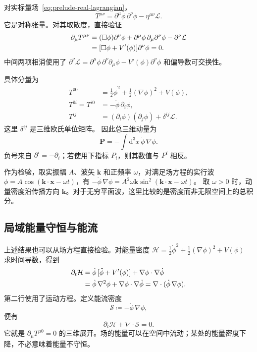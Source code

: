 对实标量场~\eqref{eq:prelude-real-lagrangian}，
\begin{equation}
  T^{\mu\nu}=\partial^{\mu}\phi\,\partial^{\nu}\phi
  -\eta^{\mu\nu}\mathcal{L}.
  \label{eq:prelude-scalar-tensor}
\end{equation}
它是对称张量。对其取散度，直接验证
\begin{align}
  \partial_{\mu}T^{\mu\nu}
  &=(\Box\phi)\partial^{\nu}\phi
    +\partial^{\mu}\phi\,\partial_{\mu}\partial^{\nu}\phi
    -\partial^{\nu}\mathcal{L}\notag\\
  &=[\Box\phi+V'(\phi)]\partial^{\nu}\phi=0.
\end{align}
中间两项相消使用了 $\partial^{\nu}\mathcal{L}
=\partial^{\mu}\phi\,\partial^{\nu}\partial_{\mu}\phi
-V'(\phi)\partial^{\nu}\phi$ 和偏导数可交换性。

具体分量为
\begin{align}
  T^{00}&=\frac12\dot\phi^{2}
    +\frac12(\nabla\phi)^{2}+V(\phi),\\
  T^{0i}=T^{i0}&=-\dot\phi\,\partial_{i}\phi,\\
  T^{ij}&=(\partial_{i}\phi)(\partial_{j}\phi)
    +\delta^{ij}\mathcal{L}.
\end{align}
这里 $\delta^{ij}$ 是三维欧氏单位矩阵。
因此总三维动量为
\begin{equation}
  \bm{P}=-\int\mathrm{d}^{3}x\,\dot\phi\,\nabla\phi.
  \label{eq:prelude-scalar-momentum}
\end{equation}
负号来自 $\partial^{i}=-\partial_{i}$；若使用下指标 $P_{i}$，则其数值与 $P^{i}$ 相反。

作为检验，取实振幅 $A$、波矢 $\bm{k}$ 和正频率 $\omega$，对满足场方程的实行波
$\phi=A\cos(\bm{k}\cdot\bm{x}-\omega t)$，有
$-\dot\phi\,\nabla\phi
=A^{2}\omega\bm{k}\sin^{2}(\bm{k}\cdot\bm{x}-\omega t)$。
取 $\omega>0$ 时，动量密度沿传播方向 $\bm{k}$。对于无穷平面波，这里比较的是密度而非无限空间上的总积分。

\subsection{局域能量守恒与能流}

上述结果也可以从场方程直接检验。对能量密度
$\mathcal{H}=\tfrac12\dot\phi^{2}+\tfrac12(\nabla\phi)^{2}+V(\phi)$ 求时间导数，得到
\begin{align}
  \partial_{t}\mathcal{H}
  &=\dot\phi\,[\ddot\phi+V'(\phi)]
    +\nabla\phi\cdot\nabla\dot\phi\notag\\
  &=\dot\phi\,\nabla^{2}\phi
    +\nabla\phi\cdot\nabla\dot\phi
   =\nabla\cdot(\dot\phi\,\nabla\phi).
\end{align}
第二行使用了运动方程。定义能流密度
\begin{equation}
  \bm{\mathcal{S}}\coloneqq-\dot\phi\,\nabla\phi,
\end{equation}
便有
\begin{equation}
  \partial_{t}\mathcal{H}+\nabla\cdot\bm{\mathcal{S}}=0.
\end{equation}
它就是 $\partial_{\mu}T^{\mu0}=0$ 的三维展开。场的能量可以在空间中流动；某处的能量密度下降，不必意味着能量不守恒。

